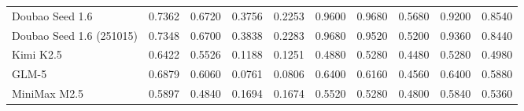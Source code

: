 \begin{table}[ht]
\begin{tabular}{l|cc|cc|ccccc}
Doubao Seed 1.6 & 0.7362 & 0.6720 & 0.3756 & 0.2253 & 0.9600 & 0.9680 & 0.5680 & 0.9200 & 0.8540 \\
Doubao Seed 1.6 (251015) & 0.7348 & 0.6700 & 0.3838 & 0.2283 & 0.9680 & 0.9520 & 0.5200 & 0.9360 & 0.8440 \\
Kimi K2.5 & 0.6422 & 0.5526 & 0.1188 & 0.1251 & 0.4880 & 0.5280 & 0.4480 & 0.5280 & 0.4980 \\
GLM-5 & 0.6879 & 0.6060 & 0.0761 & 0.0806 & 0.6400 & 0.6160 & 0.4560 & 0.6400 & 0.5880 \\
MiniMax M2.5 & 0.5897 & 0.4840 & 0.1694 & 0.1674 & 0.5520 & 0.5280 & 0.4800 & 0.5840 & 0.5360 \\
\bottomrule
\end{tabular}
\end{table}